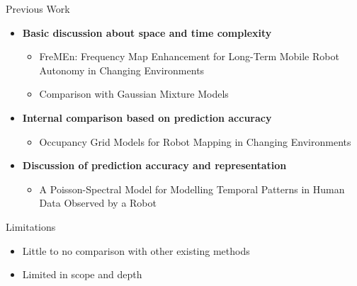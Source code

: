 \documentclass{beamer}
\begin{document}
\begin{frame}[t]{Previous Work}

  \begin{itemize}
    \item \textbf{Basic discussion about space and time complexity}
      \begin{itemize}
        \item \scriptsize FreMEn: Frequency Map Enhancement for Long-Term Mobile Robot Autonomy in Changing Environments \cite{Krajnik2015} \normalsize
        \item Comparison with Gaussian Mixture Models
      \end{itemize}


    \item \textbf{Internal comparison based on prediction accuracy}
      \begin{itemize}
        \item \scriptsize Occupancy Grid Models for Robot Mapping in Changing Environments \cite{Meyer-Delius2012} \normalsize
      \end{itemize}

    \item \textbf{Discussion of prediction accuracy and representation}
      \begin{itemize}
        \item \scriptsize A Poisson-Spectral Model for Modelling Temporal Patterns in Human Data Observed by a Robot \cite{Jovan2016} \normalsize
      \end{itemize}
  \end{itemize}

  \begin{block}{Limitations}
    \begin{itemize}
      \item Little to no comparison with other existing methods
      \item Limited in scope and depth
    \end{itemize}
  \end{block}

\end{frame}
\end{document}
